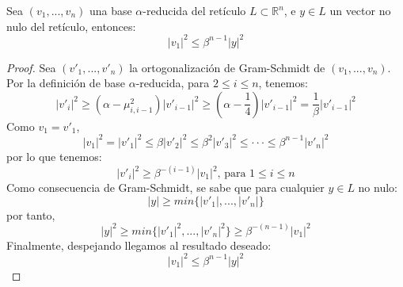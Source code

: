     \begin{teorema} \cite{artLLL}
        Sea $(v_{1}, ... , v_{n})$ una base $\alpha$-reducida del retículo $L \subset \mathbb{R}^{n}$, e $y \in L$ un vector no nulo del retículo, entonces:
        \begin{equation}
            \left| v_{1} \right|^{2} \leq \beta^{n-1} \left| y \right|^{2}
        \end{equation}
    \end{teorema}

    \begin{proof}
        Sea $(v'_{1}, ... , v'_{n})$ la ortogonalización de Gram-Schmidt de $(v_{1}, ... , v_{n})$. Por la definición de base $\alpha$-reducida, para $2 \leq i \leq n$, tenemos:
        \begin{equation}
            \left| v'_{i} \right|^{2} \geq (\alpha - \mu_{i,i-1}^{2}) \left| v'_{i-1} \right|^{2} \geq (\alpha - \frac{1}{4})\left| v'_{i-1} \right|^{2} = \frac{1}{\beta} \left| v'_{i-1} \right|^{2}
        \end{equation}
        Como $v_{1} = v'_{1}$, 
        \begin{equation}
            \left| v_{1} \right|^{2} = \left| v'_{1} \right|^{2} \leq \beta \left| v'_{2} \right|^{2} \leq \beta^{2} \left| v'_{3} \right|^{2} \leq \cdot \cdot \cdot \leq \beta^{n-1} \left| v'_{n} \right|^{2} 
        \end{equation}
        por lo que tenemos:
        \begin{equation}
            \left| v'_{i} \right|^{2} \geq \beta^{-(i-1)} \left| v_{1} \right|^{2} \text{, para } 1 \leq i \leq n
        \end{equation}
        Como consecuencia de Gram-Schmidt, se sabe que para cualquier $y \in L$ no nulo:
        \begin{equation}
            \left| y \right| \geq min\{\left| v'_{1} \right|, ... , \left| v'_{n} \right|\}
        \end{equation}
        por tanto,
        \begin{equation}
            \left| y \right|^{2} \geq min\{\left| v'_{1} \right|^{2}, ... , \left| v'_{n} \right|^{2}\} \geq \beta^{-(n-1)} \left| v_{1} \right|^{2}
        \end{equation}
        Finalmente, despejando llegamos al resultado deseado:
        \begin{equation}
            \left| v_{1} \right|^{2} \leq \beta^{n-1} \left| y \right|^{2}
        \end{equation}
    \end{proof}

